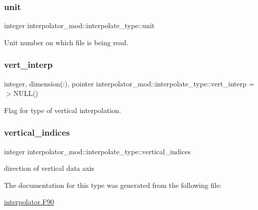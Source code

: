 \subsubsection{\texorpdfstring{unit}{unit}}
{\footnotesize\ttfamily integer interpolator\+\_\+mod\+::interpolate\+\_\+type\+::unit}



Unit number on which file is being read. 

\mbox{\label{structinterpolator__mod_1_1interpolate__type_a7257d09acb88219d06e28f21bc05db60}} 
\subsubsection{\texorpdfstring{vert\+\_\+interp}{vert\_interp}}
{\footnotesize\ttfamily integer, dimension(\+:), pointer interpolator\+\_\+mod\+::interpolate\+\_\+type\+::vert\+\_\+interp =$>$N\+U\+LL()}



Flag for type of vertical interpolation. 

\mbox{\label{structinterpolator__mod_1_1interpolate__type_a1fc99882648137c3318d3ba71758b4c0}} 
\subsubsection{\texorpdfstring{vertical\+\_\+indices}{vertical\_indices}}
{\footnotesize\ttfamily integer interpolator\+\_\+mod\+::interpolate\+\_\+type\+::vertical\+\_\+indices}



direction of vertical data axis 



The documentation for this type was generated from the following file\+:\begin{DoxyCompactItemize}
\item 
\hyperlink{interpolator_8_f90}{interpolator.\+F90}\end{DoxyCompactItemize}
